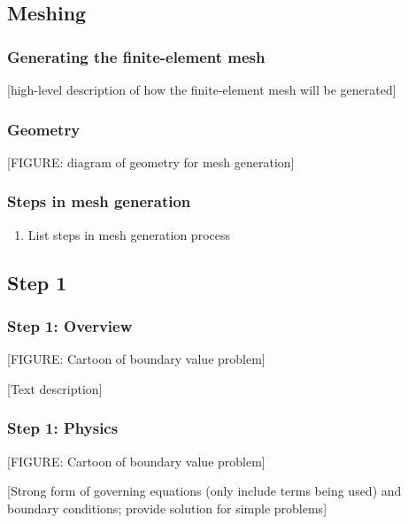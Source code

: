 \documentclass[aspectratio=169]{beamer}
\begin{document}
\subsection{Meshing}
\begin{frame}
  \frametitle{Generating the finite-element mesh}
  \summary{}

  [high-level description of how the finite-element mesh will be generated]
  
  
\end{frame}


\begin{frame}
  \frametitle{Geometry}
  \summary{}

  [FIGURE: diagram of geometry for mesh generation]
  
  
\end{frame}


\begin{frame}
  \frametitle{Steps in mesh generation}
  \summary{}

  \begin{enumerate}
  \item List steps in mesh generation process
  \end{enumerate}
  
  
\end{frame}


\subsection{Step 1}

\begin{frame}
  \frametitle{Step 1: Overview}
  \summary{}

  [FIGURE: Cartoon of boundary value problem]

  \vfill
  [Text description]
      
\end{frame}


\begin{frame}
  \frametitle{Step 1: Physics}
  \summary{}

  [FIGURE: Cartoon of boundary value problem]

  \vfill
  [Strong form of governing equations (only include terms being used) and boundary conditions;
  provide solution for simple problems]
      
\end{frame}
\end{document}
